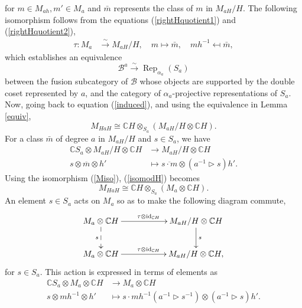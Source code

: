 \documentclass[11pt]{book}
\theoremstyle{Rem}
\theoremstyle{definition}
\numberwithin{equation}{section}
\newcommand\hit{\triangleright}
\newcommand\inv{^{-1}}
\newcommand\id{\operatorname{id}}
\newcommand\Rep{\operatorname{Rep}}
\newcommand\CC{\mathbb C}
\newcommand\B{\mathcal B}
\begin{document}
for $m \in M_{ah}, m'\in M_a$ and $\bar{m}$ represents the class of $m$ in $M_{aH}/H$. The following isomorphism follows from the equations (\ref{rightHquotient1}) and (\ref{rightHquotient2}),\begin{align}\label{Miso}
	\tau: M_a &\overset{\sim} \longrightarrow M_{aH}/H, \quad m\mapsto \bar{m}, \quad mh\inv \mapsfrom \bar{m},
\end{align} which establishes an equivalence \begin{equation}\label{repequiv}
	 \B^a \xrightarrow{\sim} \Rep_{\alpha_a}(S_a)
\end{equation}between the fusion subcategory of $\B$ whose objects are supported by the double coset represented by $a$, and the category of $\alpha_a$-projective representations of $S_a$.
Now, going back to equation (\ref{induced}), and using the equivalence in Lemma \ref{equiv}, \begin{equation}\label{isomodH}
	  M_{HaH} \cong  \mathbb{C}H  \otimes_{S_a} (M_{aH}/H \otimes \CC H).
\end{equation} For a class $\bar{m}$ of degree $a$ in $M_{aH}/H$ and $s\in S_a$, we have \begin{align}\label{action}
 \CC S_a \otimes M_{aH}/H\otimes \CC H &\rightarrow M_{aH}/H\otimes \CC H \\
	s\otimes \overline{m} \otimes h'&\mapsto \overline{s\cdot m} \otimes (a\inv \hit s)h'.
\end{align}Using the isomorphism (\ref{Miso}),  (\ref{isomodH}) becomes \begin{equation}\label{simpleiso}
	 M_{HaH} \cong  \mathbb{C}H  \otimes_{S_a} (M_a \otimes \CC H).
\end{equation}
An element $s\in S_a$ acts on $M_{a}$ so as to make the following diagram commute, 
 \begin{equation}\label{repdiagram}
\xymatrix{ M_{a}\otimes \CC H  \ar[rr]^{\tau\otimes \id_{\CC H}} \ar@{-->}[d]_s & & M_{aH}/H\otimes \CC H \ar[d]^s \\
M_a \otimes \CC H\ar[rr]^{\tau\otimes \id_{\CC H}} && M_{aH}/H\otimes \CC H,
}
\end{equation} for $s\in S_a$. This action is expressed in terms of elements as
\begin{align}\label{action2}
	\CC S_a \otimes M_a\otimes \CC H &\rightarrow M_a\otimes \CC H \\
	s\otimes  mh\inv \otimes h'&\mapsto   s\cdot mh\inv (a\inv \hit s\inv)  \otimes (a\inv \hit s)  h'.\nonumber	
\end{align} 
\end{document}
